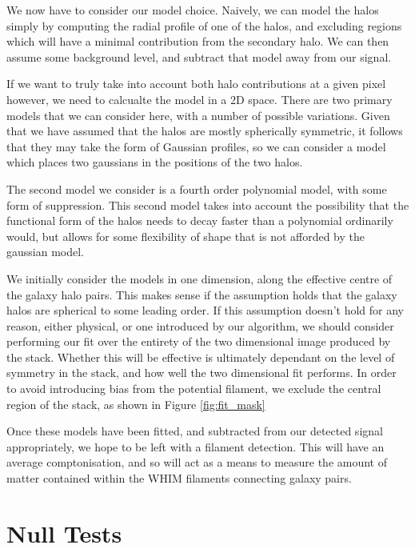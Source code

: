 \par We now have to consider our model choice. Naively, we can model the halos simply by computing the radial profile of one of the halos, and excluding regions which will have a minimal contribution from the secondary halo. We can then assume some background level, and subtract that model away from our signal. 

\par If we want to truly take into account both halo contributions at a given pixel however, we need to calcualte the model in a 2D space. There are two primary models that we can consider here, with a number of possible variations. Given that we have assumed that the halos are mostly spherically symmetric, it follows that they may take the form of Gaussian profiles, so we can consider a model which places two gaussians in the positions of the two halos. 
\par The second model we consider is a fourth order polynomial model, with some form of suppression. This second model takes into account the possibility that the functional form of the halos needs to decay faster than a polynomial ordinarily would, but allows for some flexibility of shape that is not afforded by the gaussian model.

\par We initially consider the models in one dimension, along the effective centre of the galaxy halo pairs. This makes sense if the assumption holds that the galaxy halos are spherical to some leading order. If this assumption doesn't hold for any reason, either physical, or one introduced by our algorithm, we should consider performing our fit over the entirety of the two dimensional image produced by the stack. Whether this will be effective is ultimately dependant on the level of symmetry in the stack, and how well the two dimensional fit performs. In order to avoid introducing bias from the potential filament, we exclude the central region of the stack, as shown in Figure \ref{fig:fit_mask}

\par Once these models have been fitted, and subtracted from our detected signal appropriately, we hope to be left with a filament detection. This will have an average comptonisation, and so will act as a means to measure the amount of matter contained within the WHIM filaments connecting galaxy pairs. 



\section{Null Tests}

